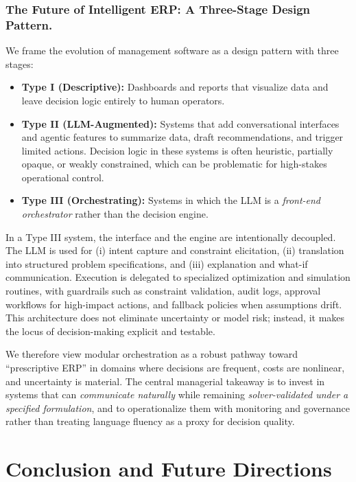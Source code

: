 \subsubsection*{The Future of Intelligent ERP: A Three-Stage Design Pattern.}
We frame the evolution of management software as a design pattern with three stages:
\begin{itemize}
    \item \textbf{Type I (Descriptive):} Dashboards and reports that visualize data and leave decision logic entirely to human operators.
    \item \textbf{Type II (LLM-Augmented):} Systems that add conversational interfaces and agentic features to summarize data, draft recommendations, and trigger limited actions. Decision logic in these systems is often heuristic, partially opaque, or weakly constrained, which can be problematic for high-stakes operational control.
    \item \textbf{Type III (Orchestrating):} Systems in which the LLM is a \emph{front-end orchestrator} rather than the decision engine.
\end{itemize}

In a Type III system, the interface and the engine are intentionally decoupled. The LLM is used for (i) intent capture and constraint elicitation, (ii) translation into structured problem specifications, and (iii) explanation and what-if communication. Execution is delegated to specialized optimization and simulation routines, with guardrails such as constraint validation, audit logs, approval workflows for high-impact actions, and fallback policies when assumptions drift. This architecture does not eliminate uncertainty or model risk; instead, it makes the locus of decision-making explicit and testable.

We therefore view modular orchestration as a robust pathway toward ``prescriptive ERP'' in domains where decisions are frequent, costs are nonlinear, and uncertainty is material. The central managerial takeaway is to invest in systems that can \emph{communicate naturally} while remaining \emph{solver-validated under a specified formulation}, and to operationalize them with monitoring and governance rather than treating language fluency as a proxy for decision quality.



\section{Conclusion and Future Directions}
\label{sec:conclusion}

